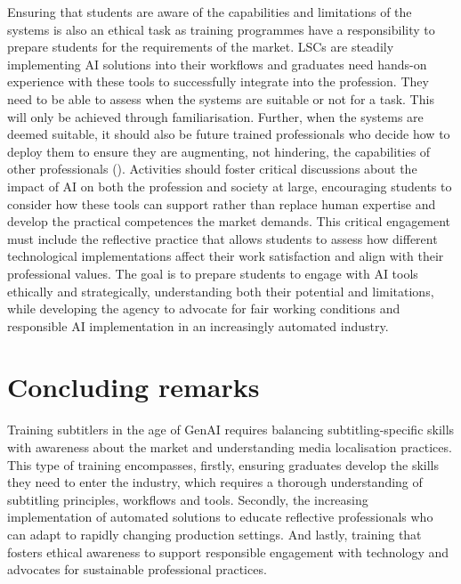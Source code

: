 \documentclass[output=paper]{langscibook}
\begin{document}
Ensuring that students are aware of the capabilities and limitations of the systems is also an ethical task as training programmes have a responsibility to prepare students for the requirements of the market. LSCs are steadily implementing AI solutions into their workflows \citep{orrego-carmona2024placing, slator2024proguide} and graduates need hands-on experience with these tools to successfully integrate into the profession. They need to be able to assess when the systems are suitable or not for a task. This will only be achieved through familiarisation. Further, when the systems are deemed suitable, it should also be future trained professionals who decide how to deploy them to ensure they are augmenting, not hindering, the capabilities of other professionals (\citealt{obrien_human-centered_2024}). Activities should foster critical discussions about the impact of AI on both the profession and society at large, encouraging students to consider how these tools can support rather than replace human expertise and develop the practical competences the market demands. This critical engagement must include the reflective practice that allows students to assess how different technological implementations affect their work satisfaction and align with their professional values. The goal is to prepare students to engage with AI tools ethically and strategically, understanding both their potential and limitations, while developing the agency to advocate for fair working conditions and responsible AI implementation in an increasingly automated industry.

\section{Concluding remarks}

Training subtitlers in the age of GenAI requires balancing subtitling-specific skills with awareness about the market and understanding media localisation practices. This type of training encompasses, firstly, ensuring graduates develop the skills they need to enter the industry, which requires a thorough understanding of subtitling principles, workflows and tools. Secondly, the increasing implementation of automated solutions to educate reflective professionals who can adapt to rapidly changing production settings. And lastly, training that fosters ethical awareness to support responsible engagement with technology and advocates for sustainable professional practices.
\end{document}
